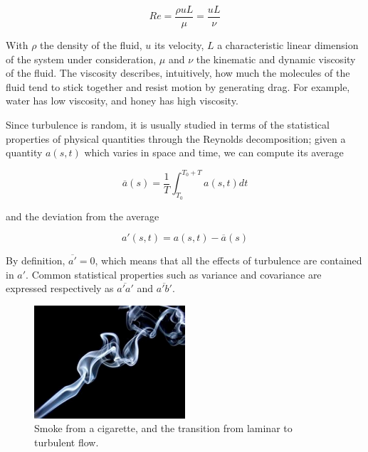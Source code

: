 \documentclass[a4paper,11pt]{kth-mag}
\begin{document}
$$
Re=\frac{\rho u L}{\mu}=\frac{uL}{\nu}
$$

With $\rho$ the density of the fluid, $u$ its velocity, $L$ a characteristic linear dimension of the system under consideration, $\mu$ and $\nu$ the kinematic and dynamic viscosity of the fluid. The viscosity describes, intuitively, how much the molecules of the fluid tend to stick together and resist motion by generating drag. For example, water has low viscosity, and honey has high viscosity.

Since turbulence is random, it is usually studied in terms of the statistical properties of physical quantities through the Reynolds decomposition; given a quantity $a(s,t)$ which varies in space and time, we can compute its average

$$
\overline{a}(s)=\frac{1}{T}\int_{T_0}^{T_0+T}a(s,t)dt
$$

\noindent and the deviation from the average

$$
a'(s,t)=a(s,t)-\overline{a}(s)
$$

By definition, $\overline{a'}=0$, which means that all the effects of turbulence are contained in $a'$. Common statistical properties such as variance and covariance are expressed respectively as $\overline{a'a'}$ and $\overline{a'b'}$.

\begin{figure}
\caption{Smoke from a cigarette, and the transition from laminar to turbulent flow.}
\label{fig:smoke}
\centering
\includegraphics[width=0.5\textwidth]{images/smoke}
\end{figure}
\end{document}
